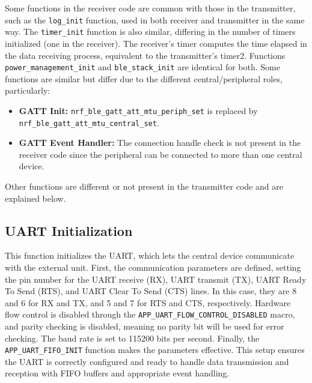 \documentclass{Configuration_Files/PoliMi3i_thesis}
\begin{document}
Some functions in the receiver code are common with those in the transmitter, such as the \texttt{log\_init} function, used in both receiver and transmitter in the same way. The \texttt{timer\_init} function is also similar, differing in the number of timers initialized (one in the receiver). The receiver’s timer computes the time elapsed in the data receiving process, equivalent to the transmitter’s timer2. Functions \texttt{power\_management\_init} and \texttt{ble\_stack\_init} are identical for both. Some functions are similar but differ due to the different central/peripheral roles, particularly:
\begin{itemize}
    \item \textbf{GATT Init:} \texttt{nrf\_ble\_gatt\_att\_mtu\_periph\_set} is replaced by \texttt{nrf\_ble\_gatt\_att\_mtu\_central\_set}.
    \item \textbf{GATT Event Handler:} The connection handle check is not present in the receiver code since the peripheral can be connected to more than one central device.
\end{itemize}

Other functions are different or not present in the transmitter code and are explained below.

\subsection*{UART Initialization}

This function initializes the UART, which lets the central device communicate with the external unit. First, the communication parameters are defined, setting the pin number for the UART receive (RX), UART transmit (TX), UART Ready To Send (RTS), and UART Clear To Send (CTS) lines. In this case, they are 8 and 6 for RX and TX, and 5 and 7 for RTS and CTS, respectively. Hardware flow control is disabled through the \texttt{APP\_UART\_FLOW\_CONTROL\_DISABLED} macro, and parity checking is disabled, meaning no parity bit will be used for error checking. The baud rate is set to 115200 bits per second. Finally, the \texttt{APP\_UART\_FIFO\_INIT} function makes the parameters effective. This setup ensures the UART is correctly configured and ready to handle data transmission and reception with FIFO buffers and appropriate event handling.
\end{document}
